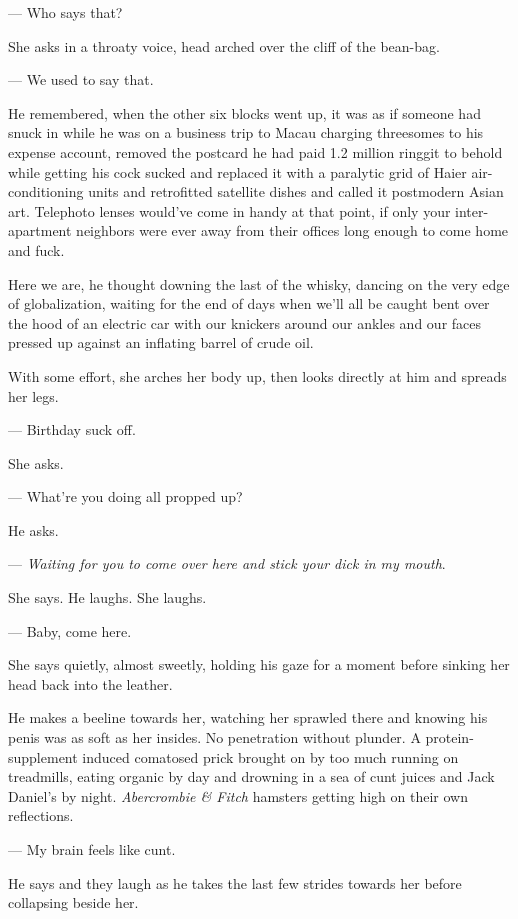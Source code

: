 \documentclass[11pt]{article}
\begin{document}
	--- Who says that?

	She asks in a throaty voice, head arched over the cliff of the bean-bag.

	--- We used to say that.

	He remembered, when the other six blocks went up, it was as if someone had 
snuck in while he was on a business trip to Macau charging threesomes to his 
expense account, removed the postcard he had paid 1.2 million ringgit to behold 
while getting his cock sucked and replaced it with a paralytic grid of Haier 
air-conditioning units and retrofitted satellite dishes and called it 
postmodern Asian art. Telephoto lenses would've come in handy at that point, if 
only your inter-apartment neighbors were ever away from their offices long 
enough to come home and fuck. 

	Here we are, he thought downing the last of the whisky, dancing on the very 
edge of globalization, waiting for the end of days when we'll all be caught 
bent over the hood of an electric car with our knickers around our ankles and 
our faces pressed up against an inflating barrel of crude oil.

	With some effort, she arches her body up, then looks directly at him and 
spreads her legs.

	--- Birthday suck off.

	She asks.

	--- What're you doing all propped up?

	He asks.

	--- \emph{Waiting for you to come over here and stick your dick in my mouth}.

	She says. He laughs. She laughs. 

	--- Baby, come here.

	She says quietly, almost sweetly, holding his gaze for a moment before
sinking her head back into the leather.

	He makes a beeline towards her, watching her sprawled there and knowing his 
penis was as soft as her insides. No penetration without plunder. A 
protein-supplement induced comatosed prick brought on by too much running on 
treadmills, eating organic by day and drowning in a sea of cunt juices and Jack 
Daniel's by night. \emph{Abercrombie \& Fitch} hamsters getting high on their own 
reflections.

	--- My brain feels like cunt. 

	He says and they laugh as he takes the last few strides towards her before 
collapsing beside her.
\end{document}

